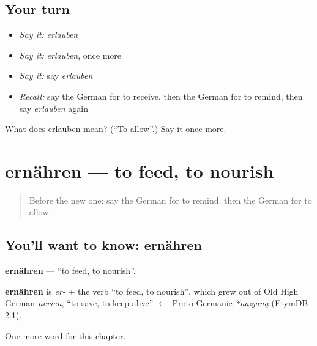 \subsection*{Your turn}
\begin{itemize}
\raggedright
  \item \emph{Say it:} \emph{erlauben}
  \item \emph{Say it:} \emph{erlauben}, once more
  \item \emph{Say it:} say \emph{erlauben}
  \item \emph{Recall:} say the German for to receive, then the German for to remind, then say \emph{erlauben} again
\end{itemize}

\begin{tcolorbox}[breakable,colback=teal!4,colframe=teal!35!black,title={Before you move on}]
What does erlauben mean? (\textquotedblleft{}To allow\textquotedblright{}.) Say it once more.
\end{tcolorbox}
\section[ernähren]{ernähren — to feed, to nourish}

\label{lesson:GE-C179-ernaehren}



\begin{quote}
Before the new one: say the German for to remind, then the German for to allow.
\end{quote}

\subsection*{You'll want to know: ernähren}
\textbf{ernähren} — \textquotedblleft{}to feed, to nourish\textquotedblright{}.

\begin{cousinweb}
\textbf{ernähren} is \emph{er-} + the verb \textquotedblleft{}to feed, to nourish\textquotedblright{}, which grew out of Old High German \emph{nerien}, \textquotedblleft{}to save, to keep alive\textquotedblright{} $\leftarrow$ Proto-Germanic \emph{*nazjaną} (EtymDB 2.1).
\end{cousinweb}

\begin{grammarlens}[title={What you've built}]
One more word for this chapter.
\end{grammarlens}

